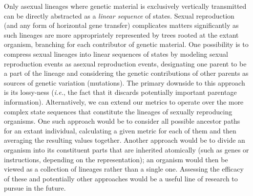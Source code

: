 \documentclass[letterpaper]{article}
\begin{document}
Only asexual lineages %
where genetic material is exclusively vertically transmitted can be directly abstracted as a \textit{linear sequence} of states.
Sexual reproduction (and any form of horizontal gene transfer) complicates matters significantly as such lineages are more appropriately represented by trees rooted at the extant organism, branching for each contributor of genetic material. 
One possibility is to compress sexual lineages into linear sequences of states by modeling sexual reproduction events as asexual reproduction events, designating one parent to be a part of the lineage and considering the genetic contributions of other parents as sources of genetic variation (mutations). The primary downside to this approach is its lossy-ness (\textit{i.e.}, the fact that it discards potentially important parentage information). 
Alternatively, we can extend our metrics to operate over the more complex state sequences that constitute the lineages of sexually reproducing organisms. One such approach would be to consider all possible ancestor paths for an extant individual, calculating a given metric for each of them and then averaging the resulting values together. Another approach would be to divide an organism into its constituent parts that are inherited atomically (such as genes or instructions, depending on the representation); an organism would then be viewed as a collection of lineages rather than a single one. 
Assessing the efficacy of these and potentially other approaches would be a useful line of research to pursue in the future.
\end{document}
